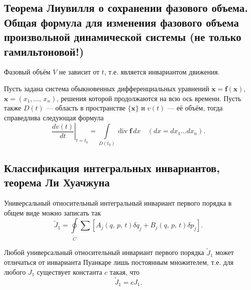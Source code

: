 \documentclass[a4paper]{article}
\begin{document}
\subsection{Теорема Лиувилля о сохранении фазового объема. Общая формула для
изменения фазового объема произвольной динамической системы (не только
гамильтоновой!)}
\begin{thm}[Лиувилля]
	Фазовый объём $V$ не зависит от $t$, т.\:е. является инвариантом
	движения.
\end{thm}
Пусть задана система обыкновенных дифференциальных уравнений 
$\dot{\mathbf{x}}=\mathbf{f}(\mathbf{x})$, $\mathbf{x}=(x_1,\ldots,\,x_n)$,
решения которой продолжаются на всю ось времени. Пусть также $D(t)$ ---
область в пространстве $\{\mathbf{x}\}$ и $v(t)$ --- её  объём, тогда
справедлива  следующая формула
\[
	\left.\frac{dv(t)}{dt}\right|_{t=t_0}= \int\limits_{D(t_0)}
		\operatorname{div}
		\mathbf{f}\,dx  \quad(dx=dx_1 \ldots dx_n)
.\] 

\subsection{Классификация интегральных инвариантов, теорема Ли Хуачжуна}
Универсальный относительный интегральный инвариант первого порядка в общем
виде можно записать так
\[
	\tilde{J}_1=\oint\limits_{\tilde{C}}\sum\left[ A_j(q,\,p,\,t)\delta q_j
	+B_j(q,\,p,\,t)\delta p_j\right] 
.\] 
\begin{thm}
	Любой универсальный относительный инвариант первого порядка $\tilde{J}_1$
	может отличаться от инварианта Пуанкаре лишь постоянным множителем,
	 т.\:е. для любого $J_1$ существует константа $c$ такая, что
	 \[
		 \tilde{J}_1=cJ_1
	 .\] 
\end{thm}
\end{document}
